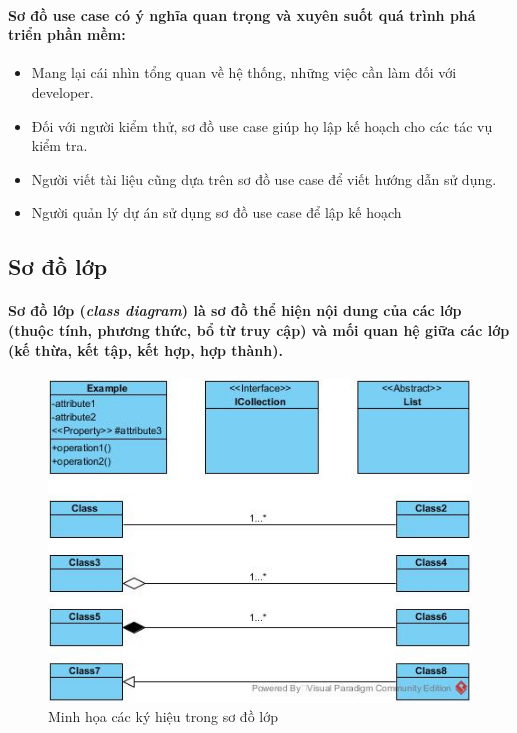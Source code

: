 \documentclass{article}
\begin{document}
  \paragraph{\textnormal{
    Sơ đồ use case có ý nghĩa quan trọng và xuyên suốt quá trình phá triển phần mềm:
  }}
  \begin{itemize}
    \item Mang lại cái nhìn tổng quan về hệ thống, những việc cần làm đối với developer.
    \item Đối với người kiểm thử, sơ đồ use case giúp họ lập kế hoạch cho các tác vụ kiểm tra.
    \item Người viết tài liệu cũng dựa trên sơ đồ use case để viết hướng dẫn sử dụng.
    \item Người quản lý dự án sử dụng sơ đồ use case để lập kế hoạch
  \end{itemize}

  \subsection{Sơ đồ lớp}

  \paragraph{\textnormal{Sơ đồ lớp (\textit{class diagram}) là sơ đồ thể hiện nội dung của các lớp (thuộc tính, phương thức, bổ từ truy cập) và mối quan hệ giữa các lớp (kế thừa, kết tập, kết hợp, hợp thành).}}

  \begin{figure}[!ht]
    \centering
    \includegraphics[scale=0.8]{../pictures/diagrams/class/class-diagram-example.jpg}
    \caption{Minh họa các ký hiệu trong sơ đồ lớp}
  \end{figure}
\end{document}
